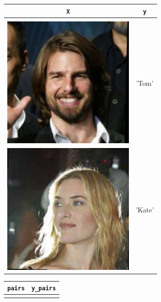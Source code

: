 \documentclass[twoside,11pt]{article}
\begin{document}
\begin{figure}[H]
  \centering
  \begin{subfigure}[t]{0.3\textwidth}
     \centering 
     \begin{tabular}{c|c}
     \texttt{X} & \texttt{y} \\ \hline \\
   \includegraphics[scale=0.15]{Tom_Cruise_0010.jpg} & 'Tom' \\
   \includegraphics[scale=0.15]{Kate_Winslet_0001.jpg} & 'Kate' \\
\end{tabular}
     \caption{}
     \label{fig:full}
     \end{subfigure}
  \hspace{5pt}
  \begin{subfigure}[t]{0.3\textwidth}
     \centering
     \begin{tabular}{c|c}
     \texttt{pairs} & \texttt{y\_pairs} \\  \hline \\

\end{tabular}
\end{subfigure}
\end{figure}
\end{document}
